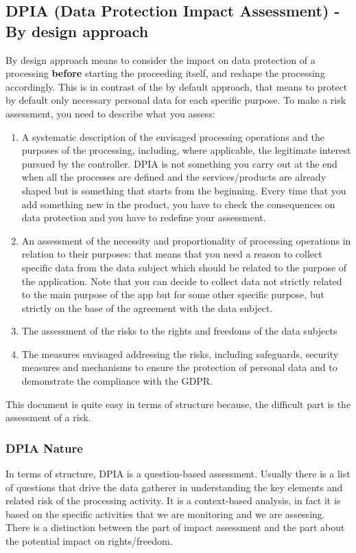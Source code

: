 \subsection{DPIA (Data Protection Impact Assessment) - By design approach}
\label{sect:DPIA}
By design approach means to consider the impact on data protection of a processing \textbf{before} starting the proceeding itself, and reshape the processing accordingly. 
This is in contrast of the by default approach, that means to protect by default only  necessary personal data for each specific purpose.
To make a risk assessment, you need to describe what you assess:
\begin{enumerate}
    \item A systematic description of the envisaged processing operations and the purposes of the processing, including, where applicable, the legitimate interest pursued by the controller. DPIA is not something you carry out at the end when all the processes are defined and the services/products are already shaped but is something that starts from the beginning. Every time that you add something new in the product, you have to check the consequences on data protection and you have to redefine your assessment. 
    \item An assessment of the necessity and proportionality of processing operations in relation to their purposes: that means that you need a reason to collect specific data from the data subject which should be related to the purpose of the application.
    Note that you can decide to collect data not strictly related to the main purpose of the app but for some other specific purpose, but strictly on the base of the agreement with the data subject.
    \item The assessment of the risks to the rights and freedoms of the data subjects
    \item The measures envisaged addressing the risks, including safeguards, security measures and mechanisms to ensure the protection of personal data and to demonstrate the compliance with the GDPR.
\end{enumerate}
This document is quite easy in terms of structure because, the difficult part is the assessment of a risk.

\subsubsection{DPIA Nature}
In terms of structure, DPIA is a question-based assessment. Usually there is a list of questions that drive the data gatherer in understanding the key elements and related risk of the processing activity.
It is a context-based analysis, in fact it is based on the specific activities that we are monitoring and we are assessing. There is a distinction between the part of impact assessment and the part about the potential impact on rights/freedom.

